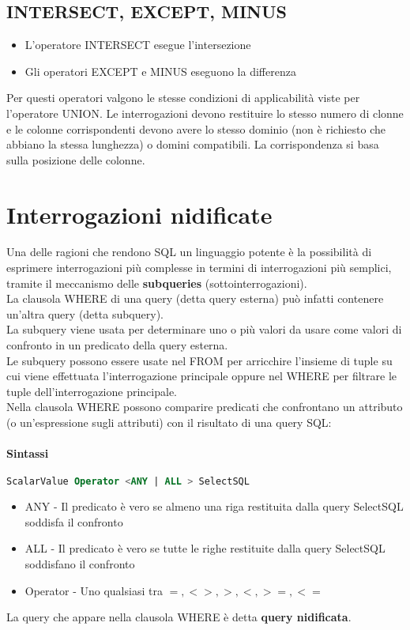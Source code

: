\subsection{INTERSECT, EXCEPT, MINUS}
\begin{itemize}
  \item L'operatore INTERSECT esegue l'intersezione
  \item Gli operatori EXCEPT e MINUS eseguono la differenza
\end{itemize}
Per questi operatori valgono le stesse condizioni di applicabilità viste per l'operatore
UNION. Le interrogazioni devono restituire lo stesso numero di clonne e le colonne corrispondenti
devono avere lo stesso dominio (non è richiesto che abbiano la stessa lunghezza) o domini compatibili.
La corrispondenza si basa sulla posizione delle colonne.\\

\section{Interrogazioni nidificate}
Una delle ragioni che rendono SQL un linguaggio potente è la possibilità di esprimere
interrogazioni più complesse in termini di interrogazioni più semplici, tramite il
meccanismo delle \textbf{subqueries} (sottointerrogazioni).\\
La clausola WHERE di una query (detta query esterna) può infatti contenere un'altra
query (detta subquery).\\
La subquery viene usata per determinare uno o più valori da usare come valori di confronto
in un predicato della query esterna.\\
Le subquery possono essere usate nel FROM per arricchire l'insieme di tuple su cui viene effettuata
l'interrogazione principale oppure nel WHERE per filtrare le tuple dell'interrogazione principale.\\
Nella clausola WHERE possono comparire predicati che confrontano un attributo (o un'espressione
sugli attributi) con il risultato di una query SQL:
\paragraph*{Sintassi}
\begin{lstlisting}[language=SQL]
  ScalarValue Operator <ANY | ALL > SelectSQL
\end{lstlisting}
\begin{itemize}
  \item ANY - Il predicato è vero se almeno una riga restituita dalla query SelectSQL 
  soddisfa il confronto
  \item ALL - Il predicato è vero se tutte le righe restituite dalla query SelectSQL soddisfano il
  confronto
  \item Operator - Uno qualsiasi tra $=, <>, >, <, >=, <=$
\end{itemize}
La query che appare nella clausola WHERE è detta \textbf{query nidificata}.\\
